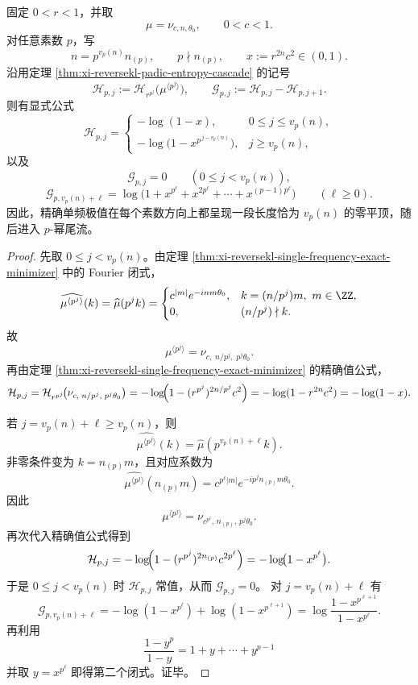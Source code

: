 \begin{theorem}\label{thm:conclusion-reversekl-extremal-prime-cascade-closed}
固定 \(0<r<1\)，并取
\[
\mu=\nu_{c,n,\theta_0},\qquad 0<c<1.
\]
对任意素数 \(p\)，写
\[
n=p^{v_p(n)}n_{(p)},
\qquad
p\nmid n_{(p)},
\qquad
x:=r^{2n}c^2\in(0,1).
\]
沿用定理 \ref{thm:xi-reversekl-padic-entropy-cascade} 的记号
\[
\mathcal H_{p,j}:=\mathcal H_{r^{p^j}}\!\bigl(\mu^{\langle p^j\rangle}\bigr),
\qquad
\mathcal G_{p,j}:=\mathcal H_{p,j}-\mathcal H_{p,j+1}.
\]
则有显式公式
\[
\mathcal H_{p,j}=
\begin{cases}
-\log(1-x),& 0\le j\le v_p(n),\\[4pt]
-\log\!\bigl(1-x^{p^{\,j-v_p(n)}}\bigr),& j\ge v_p(n),
\end{cases}
\]
以及
\[
\mathcal G_{p,j}=0
\qquad (0\le j<v_p(n)),
\]
\[
\mathcal G_{p,v_p(n)+\ell}
=
\log\!\bigl(1+x^{p^\ell}+x^{2p^\ell}+\cdots+x^{(p-1)p^\ell}\bigr)
\qquad (\ell\ge 0).
\]
因此，精确单频极值在每个素数方向上都呈现一段长度恰为 \(v_p(n)\) 的零平顶，随后进入 \(p\)-幂尾流。
\end{theorem}
\begin{proof}
先取 \(0\le j<v_p(n)\)。由定理 \ref{thm:xi-reversekl-single-frequency-exact-minimizer} 中的 Fourier 闭式，
\[
\widehat{\mu^{\langle p^j\rangle}}(k)
=\widehat\mu(p^jk)
=
\begin{cases}
c^{|m|}e^{-inm\theta_0},& k=(n/p^j)m,\ m\in\ZZ,\\
0,& (n/p^j)\nmid k.
\end{cases}
\]
故
\[
\mu^{\langle p^j\rangle}=\nu_{c,\;n/p^j,\;p^j\theta_0}.
\]
再由定理 \ref{thm:xi-reversekl-single-frequency-exact-minimizer} 的精确值公式，
\[
\mathcal H_{p,j}
=\mathcal H_{r^{p^j}}\!\bigl(\nu_{c,\;n/p^j,\;p^j\theta_0}\bigr)
=-\log\!\Bigl(1-(r^{p^j})^{2n/p^j}c^2\Bigr)
=-\log(1-r^{2n}c^2)
=-\log(1-x).
\]

若 \(j=v_p(n)+\ell\ge v_p(n)\)，则
\[
\widehat{\mu^{\langle p^j\rangle}}(k)=\widehat\mu(p^{v_p(n)+\ell}k).
\]
非零条件变为 \(k=n_{(p)}m\)，且对应系数为
\[
\widehat{\mu^{\langle p^j\rangle}}(n_{(p)}m)
=c^{p^\ell|m|}e^{-ip^jn_{(p)}m\theta_0}.
\]
因此
\[
\mu^{\langle p^j\rangle}
=\nu_{c^{p^\ell},\,n_{(p)},\,p^j\theta_0}.
\]
再次代入精确值公式得到
\[
\mathcal H_{p,j}
=-\log\!\Bigl(1-(r^{p^j})^{2n_{(p)}}c^{2p^\ell}\Bigr)
=-\log\!\bigl(1-x^{p^\ell}\bigr).
\]
于是 \(0\le j<v_p(n)\) 时 \(\mathcal H_{p,j}\) 常值，从而 \(\mathcal G_{p,j}=0\)。
对 \(j=v_p(n)+\ell\) 有
\[
\mathcal G_{p,v_p(n)+\ell}
=-\log(1-x^{p^\ell})+\log(1-x^{p^{\ell+1}})
=\log\frac{1-x^{p^{\ell+1}}}{1-x^{p^\ell}}.
\]
再利用
\[
\frac{1-y^p}{1-y}=1+y+\cdots+y^{p-1}
\]
并取 \(y=x^{p^\ell}\) 即得第二个闭式。证毕。
\end{proof}

